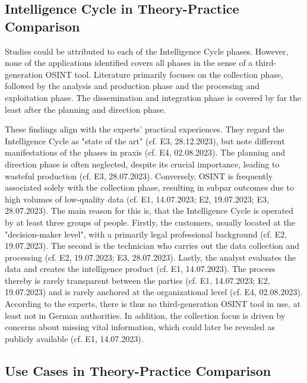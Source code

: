 \documentclass[10pt]{article}
\begin{document}
\subsection{Intelligence Cycle in Theory-Practice Comparison}

Studies could be attributed to each of the Intelligence Cycle phases. However,
none of the applications identified covers all phases in the sense of a third-generation
OSINT tool. Literature primarily focuses on the collection phase, followed by
the analysis and production phase and the processing and exploitation phase.
The dissemination and integration phase is covered by far the least after the planning
and direction phase.

These findings align with the experts' practical experiences. They regard the Intelligence Cycle as "state of the art" (cf. E3, 28.12.2023), but note different manifestations of the phases in praxis (cf. E4, 02.08.2023).
The planning and direction phase is often neglected, despite its crucial importance, leading to wasteful production (cf. E3, 28.07.2023). Conversely, OSINT is frequently associated solely with the collection phase,
resulting in subpar outcomes due to high volumes of low-quality data (cf. E1, 14.07.2023; E2, 19.07.2023; E3, 28.07.2023). The main reason for this is, that the Intelligence Cycle is operated by at least three groups of people. Firstly, the customers, usually located at the "decision-maker level", with a primarily legal professional background (cf. E2, 19.07.2023).
The second is the technician who carries out the data collection and processing (cf. E2, 19.07.2023; E3, 28.07.2023). Lastly, the analyst evaluates the data and creates the intelligence product (cf. E1, 14.07.2023). The process thereby is rarely transparent between the parties
(cf. E1, 14.07.2023; E2, 19.07.2023) and is rarely anchored at the organizational level (cf. E4, 02.08.2023). According to the experts, there is thus no third-generation
OSINT tool in use, at least not in German authorities. In addition, the collection focus is driven by concerns about missing vital information, which could later be revealed as publicly available (cf. E1, 14.07.2023).

\subsection{Use Cases in Theory-Practice Comparison}
\end{document}
